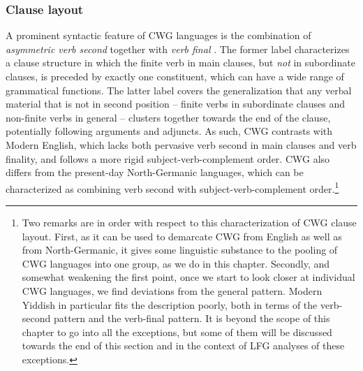 \documentclass[output=paper,hidelinks]{langscibook}
\begin{document}
\subsubsection{Clause layout\label{sec:Germanic:clauselayout}}
A prominent syntactic feature of CWG languages is the combination of
\textit{asymmetric verb second} together with \textit{verb final}
\citep{zwart:2008,haider:2010}. The former label characterizes a
clause structure in which the finite verb in main clauses, but
\textit{not} in subordinate clauses, is preceded by exactly one
constituent, which can have a wide range of grammatical functions. The
latter label covers the generalization that any verbal material that
is not in second position -- finite verbs in subordinate clauses and
non-finite verbs in general -- clusters together towards the end of
the clause, potentially following arguments and adjuncts. As such, CWG
contrasts with Modern English, which lacks both pervasive verb second
in main clauses and verb finality, and follows a more rigid
subject-verb-complement order. CWG also differs from the present-day
North-Germanic languages, which can be characterized as combining verb
second with subject-verb-complement order.\footnote{Two remarks are in
order with respect to this characterization of CWG clause
layout. First, as it can be used to demarcate CWG from English as well
as from North-Germanic, it gives some linguistic substance to the
pooling of CWG languages into one group, as we do in this
chapter. Secondly, and somewhat weakening the first point, once we
start to look closer at individual CWG languages, we find deviations
from the general pattern. Modern Yiddish in particular fits the
description poorly, both in terms of the verb-second pattern and the
verb-final pattern. It is beyond the scope of this chapter to go into
all the exceptions, but some of them will be discussed towards the end
of this section and in the context of LFG analyses of these
exceptions.}
\end{document}
